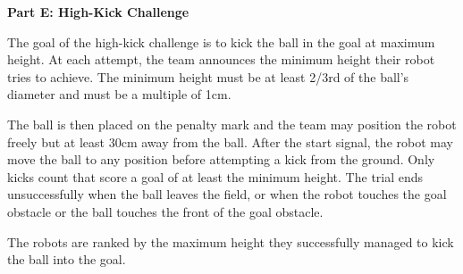 \clearpage
\sffamily
{\bfseries\color[rgb]{0.4,0.4,0.4} Part E: High-Kick Challenge}
{}


\bigskip

The goal of the high-kick challenge is to kick the ball in the goal at maximum height.
At each attempt, the team announces the minimum height their robot tries to achieve.
The minimum height must be at least 2/3rd of the ball's diameter and must be a
multiple of 1cm.

The ball is then placed on the penalty mark and the team may position the robot
freely but at least 30cm away from the ball.
After the start signal, the robot may move the ball to any position before
attempting a kick from the ground.
Only kicks count that score a goal of at least the minimum height.
The trial ends unsuccessfully when the ball leaves the field, or when the robot
touches the goal obstacle or the ball touches the front of the goal obstacle.

The robots are ranked by the maximum height they successfully managed to kick
the ball into the goal.
